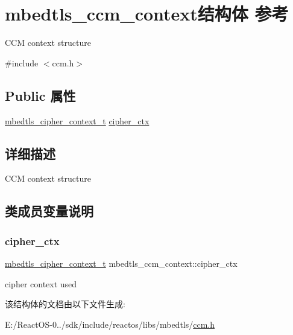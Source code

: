 \hypertarget{structmbedtls__ccm__context}{}\section{mbedtls\+\_\+ccm\+\_\+context结构体 参考}
\label{structmbedtls__ccm__context}


C\+CM context structure  




{\ttfamily \#include $<$ccm.\+h$>$}

\subsection*{Public 属性}
\begin{DoxyCompactItemize}
\item 
\hyperlink{structmbedtls__cipher__context__t}{mbedtls\+\_\+cipher\+\_\+context\+\_\+t} \hyperlink{structmbedtls__ccm__context_a6d270f32b6d211bc94be981ac7572b1e}{cipher\+\_\+ctx}
\end{DoxyCompactItemize}


\subsection{详细描述}
C\+CM context structure 

\subsection{类成员变量说明}
\mbox{\label{structmbedtls__ccm__context_a6d270f32b6d211bc94be981ac7572b1e}} 
\subsubsection{\texorpdfstring{cipher\+\_\+ctx}{cipher\_ctx}}
{\footnotesize\ttfamily \hyperlink{structmbedtls__cipher__context__t}{mbedtls\+\_\+cipher\+\_\+context\+\_\+t} mbedtls\+\_\+ccm\+\_\+context\+::cipher\+\_\+ctx}

cipher context used 

该结构体的文档由以下文件生成\+:\begin{DoxyCompactItemize}
\item 
E\+:/\+React\+O\+S-\/0../sdk/include/reactos/libs/mbedtls/\hyperlink{ccm_8h}{ccm.\+h}\end{DoxyCompactItemize}
